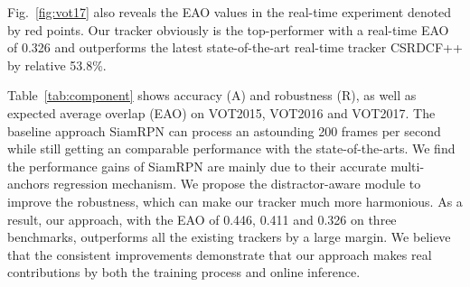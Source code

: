 \documentclass[runningheads]{llncs}
\begin{document}
Fig.~\ref{fig:vot17} also reveals the EAO values in the real-time experiment denoted by red points. Our tracker obviously is the top-performer with a real-time EAO of 0.326 and outperforms the latest state-of-the-art real-time tracker CSRDCF++ by relative 53.8\%.

Table~\ref{tab:component} shows accuracy (A) and robustness (R), as well as expected average overlap (EAO) on VOT2015, VOT2016 and VOT2017.
The baseline approach SiamRPN can process an astounding 200 frames per second while still getting an comparable performance with the state-of-the-arts.
We find the performance gains of SiamRPN are mainly due to their accurate multi-anchors regression mechanism. We propose the distractor-aware module to improve the robustness, which can make our tracker much more harmonious.
As a result, our approach, with the EAO of 0.446, 0.411 and 0.326 on three benchmarks, outperforms all the existing trackers by a large margin.
We believe that the consistent improvements demonstrate that our approach makes real contributions by both the training process and online inference.
\end{document}
